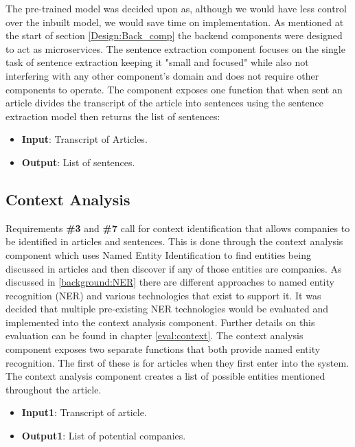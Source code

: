        The pre-trained model was decided upon as, although we would have less control over the inbuilt model, we would save time on implementation. As mentioned at the start of section \ref{Design:Back_comp} the backend components were designed to act as microservices. The sentence extraction component focuses on the single task of sentence extraction keeping it "small and focused" \cite{microservices} while also not interfering with any other component's domain and does not require other components to operate. The component exposes one function that when sent an article divides the transcript of the article into sentences using the sentence extraction model then returns the list of sentences:

        \begin{itemize}
            \item \textbf{Input}: Transcript of Articles.
            \item \textbf{Output}: List of sentences.
        \end{itemize}
                
        
        \subsection{Context Analysis}
        \label{des:context}
        Requirements \textbf{\#3} and \textbf{\#7} call for context identification that allows companies to be identified in articles and sentences. This is done through the context analysis component which uses Named Entity Identification to find entities being discussed in articles and then discover if any of those entities are companies. As discussed in \ref{background:NER} there are different approaches to named entity recognition (NER) and various technologies that exist to support it. It was decided that multiple pre-existing NER technologies would be evaluated and implemented into the context analysis component. Further details on this evaluation can be found in chapter \ref{eval:context}. The context analysis component exposes two separate functions that both provide named entity recognition. The first of these is for articles when they first enter into the system. The context analysis component creates a list of possible entities mentioned throughout the article. 
        
        \begin{itemize}
            \item \textbf{Input1}: Transcript of article.
            \item \textbf{Output1}: List of potential companies.
        \end{itemize}
        
